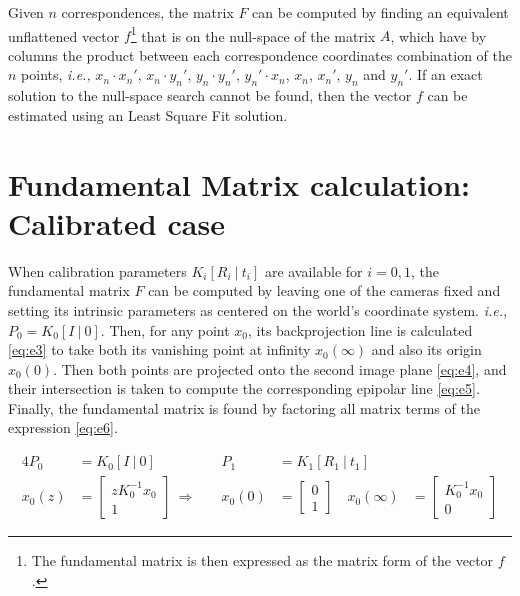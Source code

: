 \documentclass{article}
\begin{document}
Given $n$ correspondences, the matrix $F$ can be computed by finding an equivalent unflattened vector $f$\footnote{The fundamental matrix is then expressed as the matrix form of the vector $f$.} that is on the null-space of the matrix $A$, which have by columns the product between each correspondence coordinates combination of the $n$ points, \textit{i.e.,} $x_n \cdot x_n'$, $x_n \cdot y_n'$, $y_n \cdot y_n'$, $y_n' \cdot x_n$, $x_n$, $x_n'$, $y_n$ and $y_n'$. If an exact solution to the null-space search cannot be found, then the vector $f$ can be estimated using an Least Square Fit solution.

\section{Fundamental Matrix calculation: Calibrated case}
When calibration parameters $K_i[R_i ~|~ t_i]$ are available for $i = 0,1$, the fundamental matrix $F$ can be computed by leaving one of the cameras fixed and setting its intrinsic parameters as centered on the world's coordinate system. \textit{i.e.,} $P_0 = K_0[I ~|~ 0]$. Then, for any point $x_0$, its backprojection line is calculated \eqref{eq:e3} to take both its vanishing point at infinity $x_0(\infty)$ and also its origin $x_0(0)$. Then both points are projected onto the second image plane \eqref{eq:e4}, and their intersection is taken to compute the corresponding epipolar line \eqref{eq:e5}. Finally, the fundamental matrix is found by factoring all matrix terms of the expression \eqref{eq:e6}.

\begin{alignat}{4}
\nonumber
P_0 &= K_0 [I ~|~ 0] \quad &P_1 &= K_1 [R_1 ~|~ t_1] \\
x_0(z) &= \begin{bmatrix}
z K_0^{-1} x_0 \\ 1
\end{bmatrix}  ~\Rightarrow \quad &x_0(0) &= \begin{bmatrix}
0 \\ 1
\end{bmatrix} \quad x_0(\infty) &= \begin{bmatrix}
K_0^{-1} x_0 \\ 0
\end{bmatrix} \label{eq:e3}
\end{alignat}  
\end{document}
